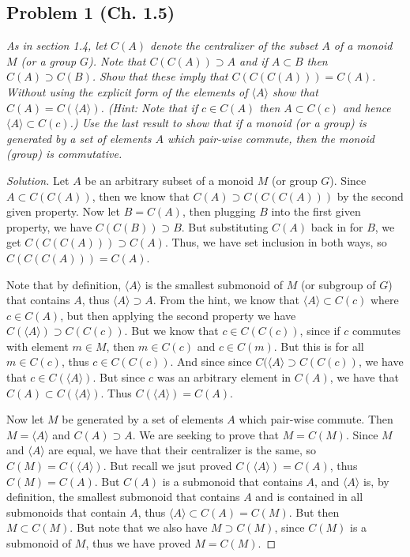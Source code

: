 \documentclass{article}
\begin{document}
\subsection*{Problem 1 (Ch. 1.5)}
{\it As in section 1.4, let $C(A)$ denote the centralizer of the subset $A$
of a monoid $M$ (or a group $G$).
Note that $C(C(A)) \supset A$ and if $A \subset B$ then $C(A) \supset C(B)$.
Show that these imply that $C(C(C(A))) = C(A)$.
Without using the explicit form of the elements of $\langle A \rangle$
show that $C(A) = C(\langle A \rangle)$.
(\emph{Hint:} Note that if $c \in C(A)$ then $A \subset C(c)$
and hence $\langle A \rangle \subset C(c)$.)
Use the last result to show that if a monoid (or a group) is generated
by a set of elements $A$ which pair-wise commute,
then the monoid (group) is commutative.}

\begin{proof}[Solution]\let\qed\relax
	Let $A$ be an arbitrary subset of a monoid $M$ (or group $G$).
	Since $A \subset C(C(A))$,
	then we know that $C(A) \supset C(C(C(A)))$ by the second given property.
	Now let $B = C(A)$, then plugging $B$ into the first given property,
	we have $C(C(B)) \supset B$.
	But substituting $C(A)$ back in for $B$, we get
	$C(C(C(A))) \supset C(A)$.
	Thus, we have set inclusion in both ways, so $C(C(C(A))) = C(A)$.

	Note that by definition, $\langle A \rangle$ is the smallest submonoid of $M$
	(or subgroup of $G$)
	that contains $A$, thus $\langle A \rangle \supset A$.
	From the hint, we know that $\langle A \rangle \subset C(c)$
	where $c \in C(A)$,
	but then applying the second property we have $C(\langle A \rangle) \supset C(C(c))$.
	But we know that $c \in C(C(c))$, since if $c$ commutes with element
	$m \in M$,
	then $m \in C(c)$ and $c \in C(m)$.
	But this is for all $m \in C(c)$, thus $c \in C(C(c))$.
	And since since $C(\langle A \rangle \supset C(C(c))$,
	we have that $c \in C(\langle A \rangle)$.
	But since $c$ was an arbitrary element in $C(A)$,
	we have that $C(A) \subset C(\langle A \rangle)$.
	Thus $C(\langle A \rangle) = C(A)$.

	Now let $M$ be generated by a set of elements $A$
	which pair-wise commute.
	Then $M = \langle A \rangle$ and $C(A) \supset A$.
	We are seeking to prove that $M = C(M)$.
	Since $M$ and $\langle A \rangle$ are equal,
	we have that their centralizer is the same,
	so $C(M) = C(\langle A \rangle)$.
	But recall we jsut proved $C(\langle A \rangle) = C(A)$,
	thus $C(M) = C(A)$.
	But $C(A)$ is a submonoid that contains $A$,
	and $\langle A \rangle$ is, by definition,
	the smallest submonoid that contains $A$
	and is contained in all submonoids that contain $A$,
	thus $\langle A \rangle \subset C(A) = C(M)$.
	But then $M \subset C(M)$.
	But note that we also have $M \supset C(M)$,
	since $C(M)$ is a submonoid of $M$,
	thus we have proved $M = C(M)$.
\end{proof}
\end{document}
